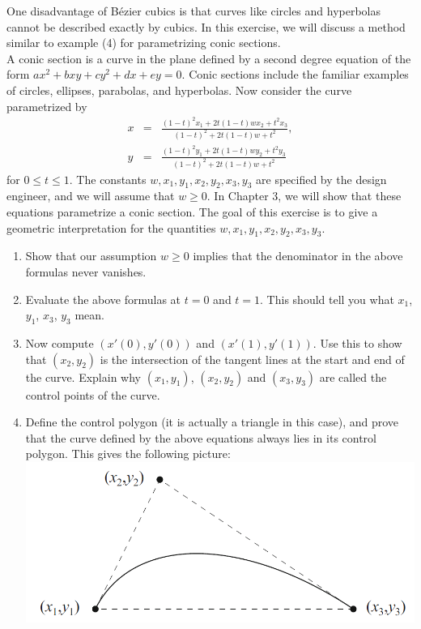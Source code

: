 \begin{exercise}{16}
One disadvantage of B\'ezier cubics is that curves like circles and hyperbolas cannot be described exactly by cubics. In this exercise, we will discuss a method similar to example (4) for parametrizing conic sections.\\

A conic section is a curve in the plane defined by a second degree equation of the form $ax^2 + bxy + cy^2 + dx + ey = 0$. Conic sections include the familiar examples of circles, ellipses, parabolas, and hyperbolas. Now consider the curve parametrized by
\begin{eqnarray*}
    x & = & \frac{(1-t)^2 x_1 + 2t(1-t)wx_2 + t^2 x_3}{(1-t)^2 + 2t(1-t)w + t^2},\\
    y & = & \frac{(1-t)^2 y_1 + 2t(1-t)wy_2 + t^2 y_3}{(1-t)^2 + 2t(1-t)w + t^2}    
\end{eqnarray*}
for $0\leq t\leq 1$. The constants $w,x_1,y_1,x_2,y_2,x_3,y_3$ are specified by the design engineer, and we will assume that $w\geq 0$. In Chapter $3$, we will show that these equations parametrize a conic section. The goal of this exercise is to give a geometric interpretation for the quantities $w,x_1,y_1,x_2,y_2,x_3,y_3$.
    \begin{enumerate}
        \item Show that our assumption $w\geq 0$ implies that the denominator in the above formulas never vanishes.
        \item Evaluate the above formulas at $t=0$ and $t=1$. This should tell you what $x_1$, $y_1$, $x_3$, $y_3$ mean.
        \item Now compute $(x'(0), y'(0))$ and $(x'(1), y'(1))$. Use this to show that $(x_2,y_2)$ is the intersection of the tangent lines at the start and end of the curve. Explain why $(x_1,y_1)$, $(x_2,y_2)$ and $(x_3,y_3)$ are called the control points of the curve.
        \item Define the control polygon (it is actually a triangle in this case), and prove that the curve defined by the above equations always lies in its control polygon. This gives the following picture:\\
        \includegraphics[width=0.8\linewidth]{cox-little-oshea/assets/sec1-3-ex16.png}

\end{enumerate}
\end{exercise}
